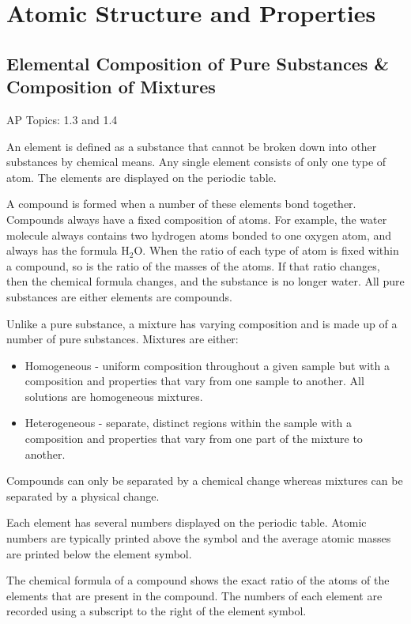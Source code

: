 \documentclass[../chem.tex]{subfiles}
\begin{document}
\chapter{Atomic Structure and Properties}
\section{Elemental Composition of Pure Substances \& Composition of Mixtures}
AP Topics: 1.3 and 1.4

An element is defined as a substance that cannot be broken down into other substances by chemical means.
Any single element consists of only one type of atom. The elements are displayed on the periodic table.

A compound is formed when a number of these elements bond together. Compounds always have a fixed composition of atoms. 
For example, the water molecule always contains two hydrogen atoms bonded to one oxygen atom, and always has the formula H$_2$O.
When the ratio of each type of atom is fixed within a compound, so is the ratio of the masses of the atoms. If that ratio changes,
then the chemical formula changes, and the substance is no longer water. All pure substances are either elements are compounds.

Unlike a pure substance, a mixture has varying composition and is made up of a number of pure substances.
Mixtures are either:
\begin{itemize}
    \item Homogeneous - uniform composition throughout a given sample but with a composition and properties that vary from one sample to another. All solutions are homogeneous mixtures.
    \item Heterogeneous - separate, distinct regions within the sample with a composition and properties that vary from one part of the mixture to another. 
\end{itemize}

Compounds can only be separated by a chemical change whereas mixtures can be separated by a physical change.

Each element has several numbers displayed on the periodic table. Atomic numbers are typically printed above the symbol and the average atomic masses are printed below the element symbol.

The chemical formula of a compound shows the exact ratio of the atoms of the elements that are present in the compound. 
The numbers of each element are recorded using a subscript to the right of the element symbol.
\end{document}
